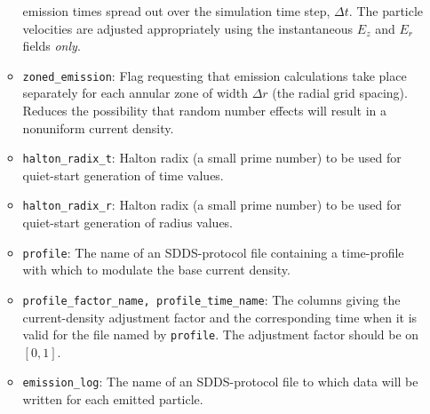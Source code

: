 \begin{itemize}
\begin{itemize}
        emission times spread out over the simulation time step, $\Delta t$.  The particle velocities
        are adjusted appropriately using the instantaneous $E_z$ and $E_r$ fields {\em only}.
    \item {\tt zoned\_emission}: Flag requesting that emission calculations take place separately
        for each annular zone of width $\Delta r$ (the radial grid spacing).  Reduces the possibility
        that random number effects will result in a nonuniform current density.
    \item {\tt halton\_radix\_t}: Halton radix (a small prime number) to be used for quiet-start
      generation of time values.
    \item {\tt halton\_radix\_r}: Halton radix (a small prime number) to be used for quiet-start
      generation of radius values.
    \item {\tt profile}: The name of an SDDS-protocol file containing a time-profile with which
        to modulate the base current density. 
    \item {\tt profile\_factor\_name, profile\_time\_name}: The columns giving the current-density
        adjustment factor and the corresponding time when it is valid for the file named by
        {\tt profile}.  The adjustment factor should be on $[0, 1]$.
    \item {\tt emission\_log}: The name of an SDDS-protocol file to which data will be written for
      each emitted particle.
\end{itemize}

\end{itemize}
